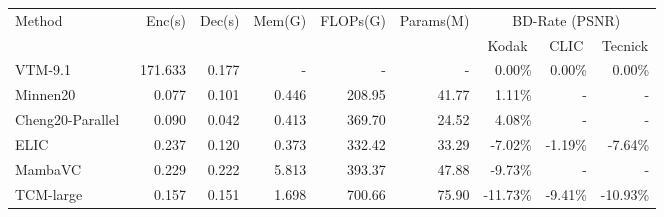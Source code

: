 \begin{table*}[t]
    \centering


\begin{tabular}{lrrrrrrrr}
\hline
\multirow{2}{*}{Method}                   & \multirow{2}{*}{Enc(s)} & \multirow{2}{*}{Dec(s)} & \multirow{2}{*}{Mem(G)} & \multirow{2}{*}{FLOPs(G)} & \multirow{2}{*}{Params(M)} & \multicolumn{3}{c}{BD-Rate (PSNR)}                                                 \\ \cline{7-9} 
                                          &                         &                         &                         &                           &                            & \multicolumn{1}{c}{Kodak} & \multicolumn{1}{c}{CLIC} & \multicolumn{1}{c}{Tecnick} \\ \hline
VTM-9.1                                   & 171.633                 & 0.177                   & -                       & -                         & -                          & 0.00\%                    & 0.00\%                   & 0.00\%                      \\
Minnen20~\cite{Minnen.2020.Charm}   & 0.077                   & 0.101                   & 0.446                   & 208.95                    & 41.77                      & 1.11\%                    & -                        & -                           \\
Cheng20-Parallel~\cite{He.2022.ELIC} & 0.090                   & 0.042                   & 0.413                   & 369.70                    & 24.52                      & 4.08\%                    & -                        & -                           \\
ELIC~\cite{He.2022.ELIC}                  & 0.237                   & 0.120                   & 0.373                   & 332.42                    & 33.29                      & -7.02\%                   & -1.19\%                  & -7.64\%                     \\
MambaVC~\cite{Qin2024MambaVCLV}           & 0.229                   & 0.222                   & 5.813                   & 393.37                    & 47.88                      & -9.73\%                   & -                        & -                           \\ \hline
TCM-large~\cite{Liu.2023.TCM}             & 0.157                   & 0.151                   & 1.698                   & 700.66                    & 75.90                      & -11.73\%                  & -9.41\%                  & -10.93\%                    \\

\end{tabular}
\end{table*}
